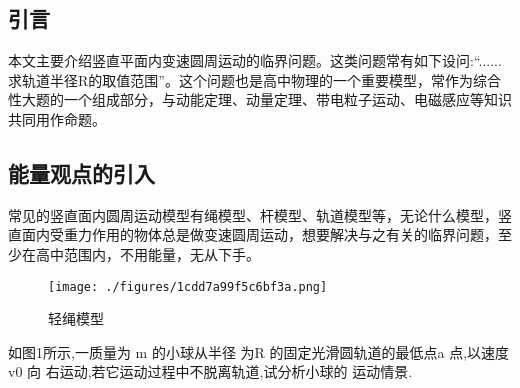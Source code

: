 

\subsection{引言}
本文主要介绍竖直平面内变速圆周运动的临界问题。这类问题常有如下设问:“......求轨道半径R的取值范围”。这个问题也是高中物理的一个重要模型，常作为综合性大题的一个组成部分，与动能定理、动量定理、带电粒子运动、电磁感应等知识共同用作命题。

\subsection{能量观点的引入}
常见的竖直面内圆周运动模型有绳模型、杆模型、轨道模型等，无论什么模型，竖直面内受重力作用的物体总是做变速圆周运动，想要解决与之有关的临界问题，至少在高中范围内，不用能量，无从下手。
\begin{figure}[ht]
\centering
\texttt{[image: ./figures/1cdd7a99f5c6bf3a.png]}
\caption{轻绳模型} \label{fig_CirVer_1}
\end{figure}
如图1所示,一质量为 m 的小球从半径
为R 的固定光滑圆轨道的最低点a 点,以速度v0 向
右运动,若它运动过程中不脱离轨道,试分析小球的
运动情景.
